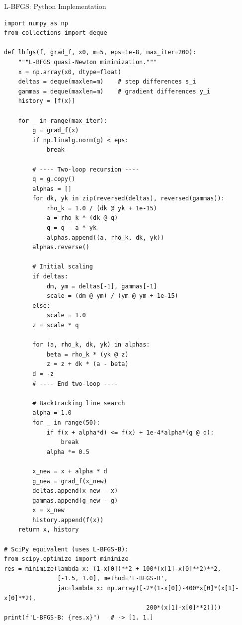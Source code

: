 \documentclass[aspectratio=169,10pt]{beamer}
\begin{document}
\begin{frame}[fragile]{L-BFGS: Python Implementation}
\begin{lstlisting}[caption={L-BFGS with two-loop recursion in Python}]
import numpy as np
from collections import deque

def lbfgs(f, grad_f, x0, m=5, eps=1e-8, max_iter=200):
    """L-BFGS quasi-Newton minimization."""
    x = np.array(x0, dtype=float)
    deltas = deque(maxlen=m)    # step differences s_i
    gammas = deque(maxlen=m)    # gradient differences y_i
    history = [f(x)]

    for _ in range(max_iter):
        g = grad_f(x)
        if np.linalg.norm(g) < eps:
            break

        # ---- Two-loop recursion ----
        q = g.copy()
        alphas = []
        for dk, yk in zip(reversed(deltas), reversed(gammas)):
            rho_k = 1.0 / (dk @ yk + 1e-15)
            a = rho_k * (dk @ q)
            q = q - a * yk
            alphas.append((a, rho_k, dk, yk))
        alphas.reverse()

        # Initial scaling
        if deltas:
            dm, ym = deltas[-1], gammas[-1]
            scale = (dm @ ym) / (ym @ ym + 1e-15)
        else:
            scale = 1.0
        z = scale * q

        for (a, rho_k, dk, yk) in alphas:
            beta = rho_k * (yk @ z)
            z = z + dk * (a - beta)
        d = -z
        # ---- End two-loop ----

        # Backtracking line search
        alpha = 1.0
        for _ in range(50):
            if f(x + alpha*d) <= f(x) + 1e-4*alpha*(g @ d):
                break
            alpha *= 0.5

        x_new = x + alpha * d
        g_new = grad_f(x_new)
        deltas.append(x_new - x)
        gammas.append(g_new - g)
        x = x_new
        history.append(f(x))
    return x, history

# SciPy equivalent (uses L-BFGS-B):
from scipy.optimize import minimize
res = minimize(lambda x: (1-x[0])**2 + 100*(x[1]-x[0]**2)**2,
               [-1.5, 1.0], method='L-BFGS-B',
               jac=lambda x: np.array([-2*(1-x[0])-400*x[0]*(x[1]-x[0]**2),
                                        200*(x[1]-x[0]**2)]))
print(f"L-BFGS-B: {res.x}")   # -> [1. 1.]
\end{lstlisting}
\end{frame}

\end{document}
